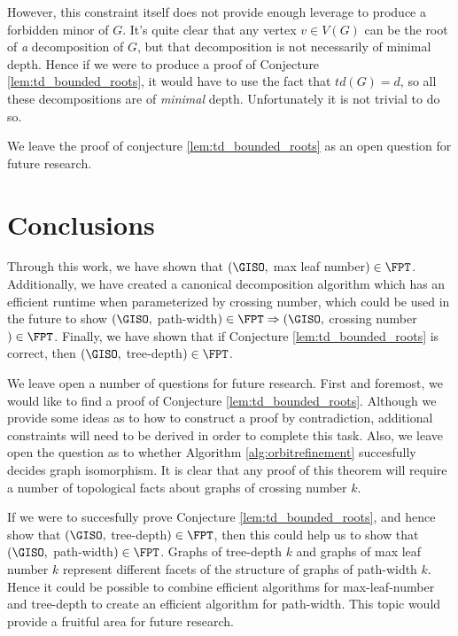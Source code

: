 \documentclass[11pt]{report}
\begin{document}
However, this constraint itself does not provide enough leverage to produce a forbidden minor of $G$. It's quite clear that any vertex $v\in V(G)$ can be the root of \emph{a} decomposition of $G$, but that decomposition is not necessarily of minimal depth. Hence if we were to produce a proof of Conjecture \ref{lem:td_bounded_roots}, it would have to use the fact that $td(G)=d$, so all these decompositions are of \emph{minimal} depth. Unfortunately it is not trivial to do so.

We leave the proof of conjecture \ref{lem:td_bounded_roots} as an open question for future research.










\chapter{Conclusions}

Through this work, we have shown that $(\GISO, $ max leaf number$)\in\FPT$.  Additionally, we have created a canonical decomposition algorithm which has an efficient runtime when parameterized by crossing number, which could be used in the future to show $(\GISO, $ path-width$)\in\FPT \Rightarrow (\GISO, $ crossing number$)\in\FPT$. Finally, we have shown that if Conjecture \ref{lem:td_bounded_roots} is correct, then $(\GISO, $ tree-depth$)\in\FPT$.

We leave open a number of questions for future research. First and foremost, we would like to find a proof of Conjecture \ref{lem:td_bounded_roots}. Although we provide some ideas as to how to construct a proof by contradiction, additional constraints will need to be derived in order to complete this task. Also, we leave open the question as to whether Algorithm \ref{alg:orbitrefinement} succesfully decides graph isomorphism. It is clear that any proof of this theorem will require a number of topological facts about graphs of crossing number $k$.


If we were to succesfully prove Conjecture \ref{lem:td_bounded_roots}, and hence show that $(\GISO, $ tree-depth$)\in\FPT$, then this could help us to show that $(\GISO, $ path-width$)\in\FPT$. Graphs of tree-depth $k$ and graphs of max leaf number $k$ represent different facets of the structure of graphs of path-width $k$. Hence it could be possible to combine efficient algorithms for max-leaf-number and tree-depth to create an efficient algorithm for path-width. This topic would provide a fruitful area for future research.
\end{document}
